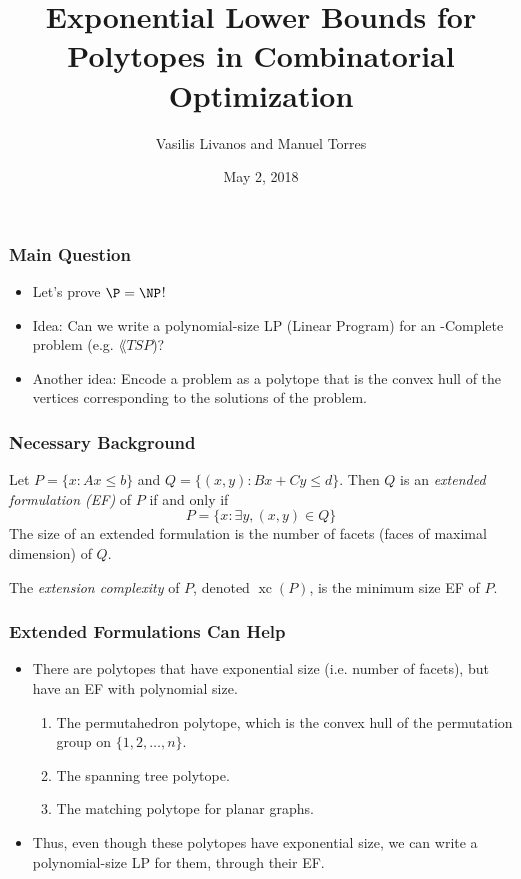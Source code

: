 \documentclass{beamer}
\author[Livanos, Torres]{Vasilis Livanos and Manuel Torres}
\title[Exp. Lower Bounds for Polytopes]{Exponential Lower Bounds for Polytopes in Combinatorial Optimization}
\institute[UIUC]{University of Illinois at Urbana-Champaign}
\date{May 2, 2018}
\newcommand{\xc}{\operatorname{xc}}
\begin{document}
\begin{frame}
\titlepage
\end{frame}


\begin{frame}
\frametitle{Main Question}

\pause
\begin{itemize}
\item Let's prove $\P = \NP$!
\pause
\item Idea: Can we write a polynomial-size LP (Linear Program) for an \NP-Complete problem (e.g. $\lang{TSP}$)?
\pause
\item Another idea: Encode a problem as a polytope that is the convex hull of the vertices corresponding to the solutions of the problem.
\end{itemize}
\end{frame}


\begin{frame}
\frametitle{Necessary Background}

\pause
\begin{definition}
Let $P = \{x : Ax \leq b\}$ and $Q = \{(x,y) : Bx + Cy \leq d\}$. Then $Q$ is an \emph{extended formulation (EF)} of $P$ if and only if
\[
P = \{x : \exists y , (x,y) \in Q\}
\]
The size of an extended formulation is the number of facets (faces of maximal dimension) of $Q$.
\end{definition}

\pause
\begin{definition}
The \emph{extension complexity} of $P$, denoted $\xc(P)$, is the minimum size EF of $P$.
\end{definition}

\end{frame}


\begin{frame}
\frametitle{Extended Formulations Can Help}

\pause
\begin{itemize}
\item There are polytopes that have exponential size (i.e. number of facets), but have an EF with polynomial size.
\pause
\begin{enumerate}
\item The permutahedron polytope, which is the convex hull of the permutation group on $\{1, 2, \ldots, n\}$.
\pause
\item The spanning tree polytope.
\pause
\item The matching polytope for planar graphs.
\end{enumerate}
\pause
\item Thus, even though these polytopes have exponential size, we can write a polynomial-size LP for them, through their EF.
\end{itemize}
\end{frame}
\end{document}
